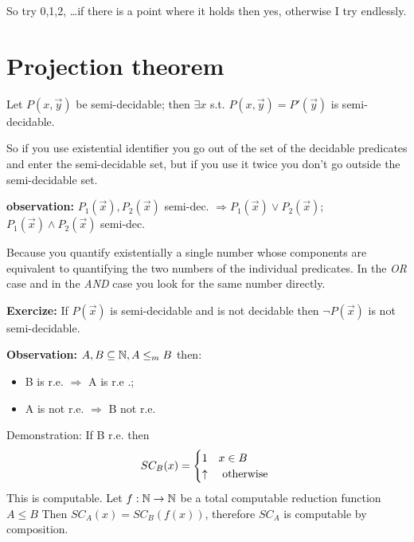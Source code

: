 So try 0,1,2, \dots if there is a point where it holds then yes, otherwise I try endlessly.

\section {Projection theorem}

Let $ P(x,\vec{y}) $ be semi-decidable; then $ \exists x $ s.t. $ P(x,\vec{y}) = P'(\vec{y})$ is semi-decidable.

So if you use existential identifier you go out of the set of the decidable predicates and enter the semi-decidable set, but if you use it twice you don't go outside the semi-decidable set.

\textbf{observation:} $ P_1(\vec{x}), P_2(\vec{x}) $ semi-dec. $ \Rightarrow P_1(\vec{x}) \lor P_2(\vec{x}) $; $ P_1(\vec{x}) \land P_2(\vec{x}) $ semi-dec.

Because you quantify existentially a single number whose components are equivalent to quantifying the two numbers of the individual predicates. In the \textit{OR} case and in the \textit{AND} case you look for the same number directly.

\textbf{Exercize:} If $ P(\vec{x}) $ is semi-decidable and is not decidable then $ \lnot P(\vec{x}) $ is not semi-decidable.

\textbf{Observation:} $ A,B \subseteq \mathbb{N}, A\leq_m B $ then:
\begin{itemize}
\item B is r.e. $ \Rightarrow $ A is r.e .;
\item A is not r.e. $ \Rightarrow $ B not r.e.
\end{itemize}
Demonstration: If B r.e. then
\begin{equation*}
  SC_B(x) = \begin{cases}
    1        & x \in B       \\
    \uparrow & $ otherwise $
  \end{cases}
\end{equation*}
This is computable. Let $ f:\mathbb{N}\rightarrow\mathbb{N} $ be a total computable reduction function\\  $ A\leq B $ Then $ SC_A(x) = SC_B(f(x)) $, therefore $ SC_A $ is computable by composition.
